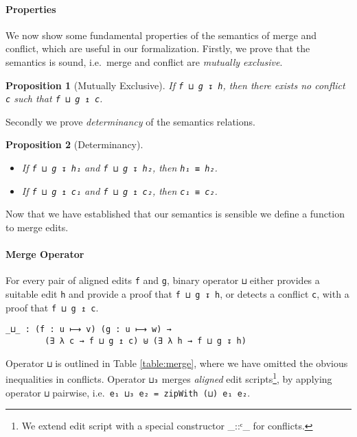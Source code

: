 \documentclass{sigplanconf}
\theoremstyle{plain}
\newtheorem{prop}{Proposition}
\begin{document}
\paragraph{Properties}
We now show some fundamental properties of the semantics of merge and
conflict, which are useful in our formalization.
Firstly, we prove that the semantics is sound, i.e.\ merge and
conflict are \emph{mutually exclusive}.
\begin{prop}[Mutually Exclusive]
  \label{prop:mutually-exclusive}
  If \texttt{f ⊔ g ↧ h}, then there exists no conflict \texttt{c} such
  that \texttt{f ⊔ g ↥ c}.
\end{prop}
Secondly we prove \emph{determinancy} of the semantics relations.
\begin{prop}[Determinancy]
\mbox{}
\label{prop:determinancy}
\begin{itemize}
\item If \texttt{f ⊔ g ↧ h₁} and \texttt{f ⊔ g ↧ h₂}, then \texttt{h₁
    ≡ h₂}.
%
\item  If \texttt{f ⊔ g ↥ c₁} and \texttt{f ⊔ g ↥ c₂}, then \texttt{c₁ ≡ c₂}.
\end{itemize}
\end{prop}
Now that we have established that our semantics is sensible we define
a function to merge edits.

\paragraph{Merge Operator}
For every pair of aligned edits \texttt{f} and \texttt{g}, binary
operator \texttt{⊔} either provides a suitable edit \texttt{h} and
provide a proof that \texttt{f ⊔ g ↧ h}, or detects a conflict
\texttt{c}, with a proof that \texttt{f ⊔ g ↥ c}.
        
\begin{verbatim}
_⊔_ : (f : u ⟼ v) (g : u ⟼ w) →
        (∃ λ c → f ⊔ g ↥ c) ⊎ (∃ λ h → f ⊔ g ↧ h)
\end{verbatim}
Operator \texttt{⊔} is outlined in Table \ref{table:merge}, where we
have omitted the obvious inequalities in conflicts.
%
Operator \texttt{⊔₃} merges \emph{aligned} edit scripts\footnote{We
  extend edit script with a special constructor \_::ᶜ\_ for
  conflicts.}, by applying operator \texttt{⊔} pairwise, i.e.\
\texttt{e₁ ⊔₃ e₂ = zipWith (⊔) e₁ e₂}.
 
%
\end{document}
